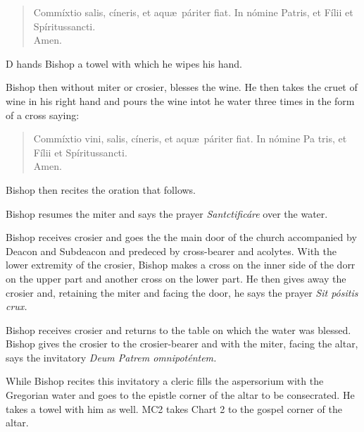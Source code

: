 \documentclass[letterpaper]{report}
\begin{document}
{\begin{quote}
    Commíxtio salis, cíneris, et aqu\ae\ páriter fiat. In nómine Pa\cross tris,
    et Fí\cross lii et Spíritus\cross sancti. \\
   \rbar Amen.
\end{quote}

D hands Bishop a towel with which he wipes his hand.

\rubric Bishop then without miter or crosier, blesses the wine. He then takes the
cruet of wine in his right hand and pours the wine intot he water three times
in the form of a cross saying:

\begin{quote}
    Commíxtio vini, salis, cíneris, et aqu\ae\ páriter fiat. In nómine Pa\cross
    tris, et Fí\cross lii et Spíritus\cross sancti. \\
   \rbar Amen.
\end{quote}

Bishop then recites the oration that follows.

\rubric Bishop resumes the miter and says the prayer \textit{Santcti\cross ficáre}
over the water.

\rubric Bishop receives crosier and goes the the main door of the church accompanied
by Deacon and Subdeacon and predeced by cross-bearer and acolytes. With the lower extremity of the
crosier, Bishop makes a cross on the inner side of the dorr on the upper part and
another cross on the lower part. He then gives away the crosier and, retaining
the miter and facing the door, he says the prayer \textit{Sit pósitis crux.}

\rubric Bishop receives crosier and returns to the table on which the water was
blessed. Bishop gives the crosier to the crosier-bearer and with the miter, facing
the altar, says the invitatory \textit{Deum Patrem omnipoténtem.}

While Bishop recites this invitatory a cleric fills the aspersorium with the
Gregorian water and goes to the epistle corner of the altar to be consecrated.
He takes a towel with him as well. MC2 takes Chart 2 to the gospel corner of
the altar.

}
\end{document}
